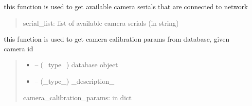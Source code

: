 \documentclass[letterpaper,10pt,english]{sphinxmanual}
\begin{document}

\begin{savenotes}\begin{fulllineitems}
\label{\detokenize{setting/backend/camera_funcs:oxin.backend.camera_funcs.get_available_cameras_list_serial_numbers}}
\pysigstartsignatures
{}
\pysigstopsignatures
\sphinxAtStartPar
this function is used to get available camera serials that are connected to network
\begin{quote}\begin{description}
\sphinxAtStartPar
serial\_list: list of available camera serials (in string)

\end{description}\end{quote}

\end{fulllineitems}\end{savenotes}


\begin{savenotes}\begin{fulllineitems}
\label{\detokenize{setting/backend/camera_funcs:oxin.backend.camera_funcs.get_camera_calibration_params_from_db}}
\pysigstartsignatures
{}
\pysigstopsignatures
\sphinxAtStartPar
this function is used to get camera calibration params from database, given camera id
\begin{quote}\begin{description}
\begin{itemize}
\item {} 
\sphinxAtStartPar
{} – (\_type\_) database object

\item {} 
\sphinxAtStartPar
{} – (\_type\_) \_description\_

\end{itemize}

\sphinxAtStartPar
camera\_calibration\_params: in dict

\end{description}\end{quote}

\end{fulllineitems}\end{savenotes}
\end{document}
